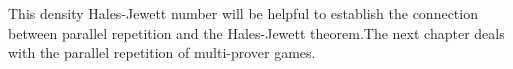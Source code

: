 This density Hales-Jewett number will be helpful to establish the connection between parallel repetition and the Hales-Jewett theorem.The next chapter deals with the parallel repetition of multi-prover games.
%

%
% 
 
 




















